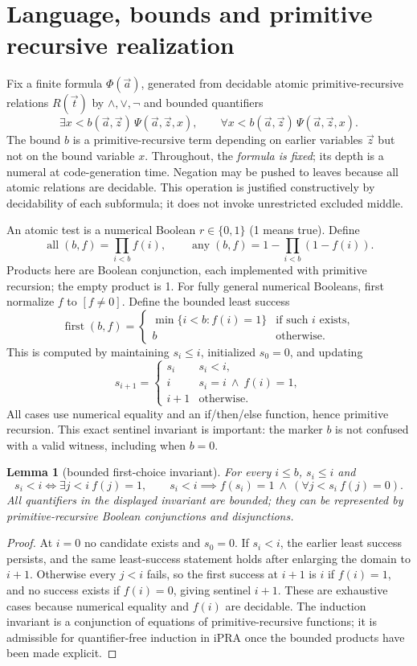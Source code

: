 \documentclass[11pt]{article}
\newtheorem{lemma}[theorem]{Lemma}
\begin{document}
\section{Language, bounds and primitive recursive realization}
Fix a finite formula $\Phi(\vec a)$, generated from decidable atomic primitive-recursive relations $R(\vec t)$ by $\wedge,\vee,\neg$ and bounded quantifiers
\[\exists x<b(\vec a,\vec z)\,\Psi(\vec a,\vec z,x),\qquad
\forall x<b(\vec a,\vec z)\,\Psi(\vec a,\vec z,x).\]
The bound $b$ is a primitive-recursive term depending on earlier variables $\vec z$ but not on the bound variable $x$. Throughout, the \emph{formula is fixed}; its depth is a numeral at code-generation time. Negation may be pushed to leaves because all atomic relations are decidable. This operation is justified constructively by decidability of each subformula; it does not invoke unrestricted excluded middle.

An atomic test is a numerical Boolean $r\in\{0,1\}$ (1 means true). Define
\[\operatorname{all}(b,f)=\prod_{i<b} f(i),\qquad
\operatorname{any}(b,f)=1-\prod_{i<b}(1-f(i)).\]
Products here are Boolean conjunction, each implemented with primitive recursion; the empty product is 1. For fully general numerical Booleans, first normalize $f$ to $[f\ne0]$. Define the bounded least success
\[\operatorname{first}(b,f)=\begin{cases}\min\{i<b:f(i)=1\}&\text{if such }i\text{ exists},\\b&\text{otherwise}.\end{cases}\]
This is computed by maintaining $s_i\le i$, initialized $s_0=0$, and updating
\[s_{i+1}=\begin{cases}s_i &s_i<i,\\i& s_i=i\ \land\ f(i)=1,\\ i+1&\text{otherwise}.\end{cases}\]
All cases use numerical equality and an if/then/else function, hence primitive recursion. This exact sentinel invariant is important: the marker $b$ is not confused with a valid witness, including when $b=0$.

\begin{lemma}[bounded first-choice invariant]\label{first}
For every $i\le b$, $s_i\le i$ and
\[s_i<i\iff\exists j<i\ f(j)=1,\qquad s_i<i\implies f(s_i)=1\ \wedge\ (\forall j<s_i\ f(j)=0).\]
All quantifiers in the displayed invariant are bounded; they can be represented by primitive-recursive Boolean conjunctions and disjunctions.
\end{lemma}
\begin{proof}
At $i=0$ no candidate exists and $s_0=0$. If $s_i<i$, the earlier least success persists, and the same least-success statement holds after enlarging the domain to $i+1$. Otherwise every $j<i$ fails, so the first success at $i+1$ is $i$ if $f(i)=1$, and no success exists if $f(i)=0$, giving sentinel $i+1$. These are exhaustive cases because numerical equality and $f(i)$ are decidable. The induction invariant is a conjunction of equations of primitive-recursive functions; it is admissible for quantifier-free induction in iPRA once the bounded products have been made explicit.
\end{proof}
\end{document}
